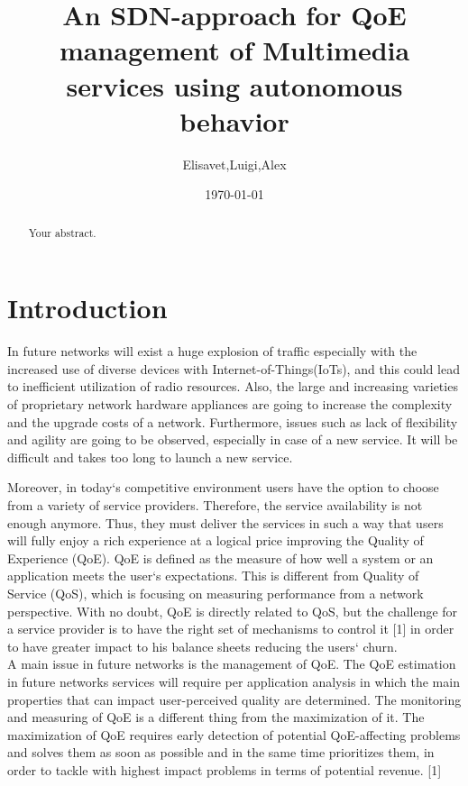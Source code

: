 \documentclass[a4paper]{article}
\title{An SDN-approach for QoE management of Multimedia services using autonomous behavior}
\author{Elisavet,Luigi,Alex}
\date{\today}
\begin{document}
\maketitle
\begin{abstract}
Your abstract.
\end{abstract}

\section{Introduction}

In  future networks will exist a huge explosion of traffic especially with the increased use of diverse devices with Internet-of-Things(IoTs), and this could lead to inefficient utilization of radio resources. Also, the large and increasing varieties of proprietary network hardware appliances are going to increase the complexity and the upgrade costs of a network. Furthermore, issues such as lack of flexibility and agility are going to be observed, especially in case of a new service. It will be difficult and takes too long to launch a new service. %

Moreover, in today`s competitive environment users have the option to choose from a variety of service providers. Therefore, the service availability is not enough anymore. Thus, they must deliver the services in such a way that users will fully enjoy a rich experience at a logical price improving the Quality of Experience (QoE). QoE is defined as the measure of how well a system or an application meets the user`s expectations. This is different from Quality of Service (QoS), which is focusing on measuring performance from a network perspective. With no doubt,  QoE is directly related to QoS, but the challenge for a service provider is to have the right set of mechanisms to control it [1] in order to have greater impact to his balance sheets reducing the users` churn. \\

A main issue in future networks is the management of QoE. The QoE estimation in future networks services will require per application analysis in which the main properties that can impact user-perceived quality are determined. The monitoring and measuring of QoE is a different thing from the maximization of it. The maximization of QoE requires early detection of potential QoE-affecting problems and solves them as soon as possible and in the same time prioritizes them, in order to tackle with highest impact problems in terms of potential revenue. [1] \\
\end{document}
